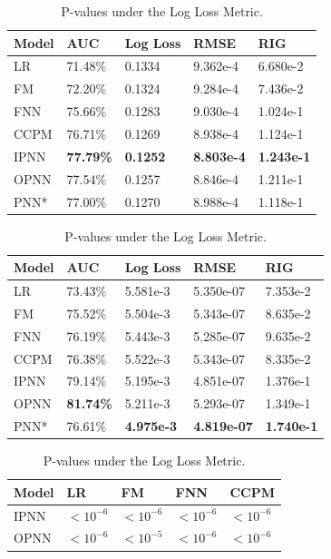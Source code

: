 \documentclass[conference]{IEEEtran}
\begin{document}
\begin{table}[t]
	\centering
	\caption{Overall Performance on the Criteo Dataset.}\label{tab:perf-criteo}
	\begin{tabular}{m{40pt}<{\centering} | m{35pt}<{\centering} m{35pt}<{\centering} m{35pt}<{\centering} m{35pt}<{\centering}}
		\hline
		Model & AUC & Log Loss & RMSE & RIG \\
		\hline
		LR & 71.48\% & 0.1334 & 9.362e-4 & 6.680e-2 \\
		FM & 72.20\% & 0.1324 & 9.284e-4 & 7.436e-2 \\
		FNN & 75.66\% & 0.1283 & 9.030e-4 & 1.024e-1 \\
		CCPM & 76.71\% & 0.1269 & 8.938e-4 & 1.124e-1 \\
		IPNN & \textbf{77.79\%} & \textbf{0.1252} & \textbf{8.803e-4} & \textbf{1.243e-1} \\
		OPNN & 77.54\% & 0.1257 & 8.846e-4 & 1.211e-1 \\
		PNN* & 77.00\% & 0.1270 & 8.988e-4 & 1.118e-1\\
		\hline
	\end{tabular}
\vspace{10pt}
	\centering
	\caption{Overall Performance on the iPinYou Dataset.}\label{tab:perf-ipinyou}
	\begin{tabular}{m{40pt}<{\centering} | m{35pt}<{\centering} m{35pt}<{\centering} m{35pt}<{\centering} m{35pt}<{\centering}}
		\hline
		Model & AUC & Log Loss & RMSE & RIG \\
		\hline
		LR & 73.43\% & 5.581e-3 & 5.350e-07 & 7.353e-2 \\
		FM & 75.52\% & 5.504e-3 & 5.343e-07 & 8.635e-2 \\
		FNN & 76.19\% & 5.443e-3 & 5.285e-07 & 9.635e-2 \\
		CCPM & 76.38\% & 5.522e-3 & 5.343e-07 & 8.335e-2 \\
		IPNN & 79.14\% & 5.195e-3 & 4.851e-07 & 1.376e-1\\
		OPNN & \textbf{81.74\%} & 5.211e-3 & 5.293e-07 & 1.349e-1 \\
		PNN* & 76.61\% & \textbf{4.975e-3} & \textbf{4.819e-07} & \textbf{1.740e-1}\\
		\hline
	\end{tabular}
	\centering
	\vspace{10pt}
    \caption{P-values under the Log Loss Metric.}\label{tab:pvalue}
	\begin{tabular}{m{40pt}<{\centering} | m{35pt}<{\centering} m{35pt}<{\centering} m{35pt}<{\centering} m{35pt}<{\centering}}
		\hline
		Model & LR & FM & FNN & CCPM \\
		\hline
		IPNN & $< 10^{-6}$ & $< 10^{-6}$ & $< 10^{-6}$ & $< 10^{-6}$ \\
		OPNN & $< 10^{-6}$ & $< 10^{-5}$ & $< 10^{-6}$ & $< 10^{-6}$ \\
		\hline
	\end{tabular}
\end{table}
\end{document}
